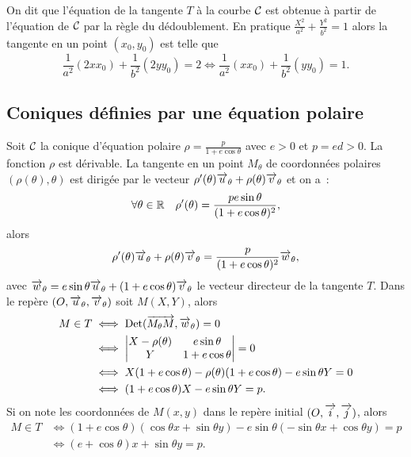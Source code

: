 On dit que l'équation de la tangente \(T\) à la courbe \(\mathcal{C}_{{}}\) est
obtenue à partir de l'équation de \(\mathcal{C}_{{}}\) par la règle du
dédoublement. En pratique \(\frac{X^2}{a^2} + \frac{Y^2}{b^2} = 1\) alors
la tangente en un point \((x_0, y_0)\) est telle que
\begin{equation}
  \frac{1}{a^2}(2xx_0) + \frac{1}{b^2}(2yy_0) = 2 \iff \frac{1}{a^2}(xx_0)
  + \frac{1}{b^2}(yy_0) = 1.
\end{equation}

\subsection{Coniques définies par une équation polaire}

Soit \(\mathcal{C}_{{}}\) la conique d'équation polaire \(\rho = \frac{p}{1 + e\cos
\theta}\) avec \(e>0\) et \(p = ed>0\). La fonction \(\rho\) est
dérivable. La tangente en un point \(M_{\theta}\) de coordonnées
polaires \((\rho(\theta),\theta)\) est dirigée par le vecteur
\(\rho'(\theta) \overrightarrow{u}_\theta + \rho(\theta) \overrightarrow{v}_\theta\) et on
a~:
\begin{equation}
  \forall \theta \in \mathbb{R} \quad
  \rho'(\theta) = \frac{pe\sin\theta}{(1 + e\cos\theta)^2},
\end{equation}
alors
\begin{equation}
  \rho'(\theta) \overrightarrow{u}_\theta + \rho(\theta) \overrightarrow{v}_\theta =
  \frac{p}{(1 + e\cos\theta)^2} \overrightarrow{w}_\theta,
\end{equation}
avec \(\overrightarrow{w}_\theta = e\sin\theta\overrightarrow{u}_\theta +
(1 + e\cos\theta)\overrightarrow{v}_\theta\) le vecteur directeur de la tangente
\(T\). Dans le repère \((O, \overrightarrow{u}_\theta, \overrightarrow{v}_\theta)\) soit
\(M(X, Y)\), alors
\begin{align}
  M \in T & \iff  \operatorname{Det}(\overrightarrow{M_\theta M},\overrightarrow{w}_\theta) = 0 \\
          & \iff \begin{vmatrix} X-\rho(\theta) & e\sin\theta \\ Y &
          1 + e\cos\theta \end{vmatrix} = 0 \\
          & \iff
          X(1 + e\cos\theta)-\rho(\theta)(1 + e\cos\theta)-e\sin\theta Y =
          0\\
          & \iff (1 + e\cos\theta)X-e\sin\theta Y = p.
\end{align}
Si on note les coordonnées de \(M(x, y)\) dans le repère initial
\((O,\overrightarrow{i},\overrightarrow{j})\), alors
\begin{align}
  M \in T &\iff (1 + e\cos\theta)(\cos\theta x + \sin\theta
  y)-e\sin\theta(-\sin\theta x + \cos\theta y) = p\\
          &\iff (e + \cos\theta)x + \sin\theta y = p.
\end{align}

